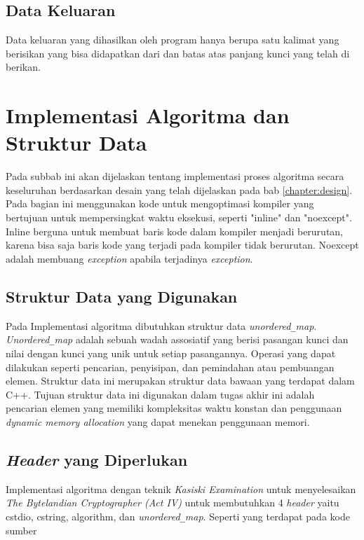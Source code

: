 \subsection{Data Keluaran}
Data keluaran yang dihasilkan oleh program hanya berupa satu kalimat yang berisikan \plaintext yang bisa didapatkan dari \ciphertext dan batas atas panjang kunci yang telah di berikan.

\section{Implementasi Algoritma dan Struktur Data}
Pada subbab ini akan dijelaskan tentang implementasi proses
algoritma secara keseluruhan berdasarkan desain yang telah
dijelaskan pada bab \ref{chapter:design}. Pada bagian ini menggunakan kode untuk mengoptimasi kompiler yang bertujuan untuk mempersingkat waktu eksekusi, seperti "inline" dan "noexcept". Inline berguna untuk membuat baris kode dalam kompiler menjadi berurutan, karena bisa saja baris kode yang terjadi pada kompiler tidak berurutan. Noexcept adalah membuang  \textit{exception} apabila terjadinya \textit{exception}.

\subsection{Struktur Data yang Digunakan}
Pada Implementasi algoritma dibutuhkan struktur data \textit{unordered}\verb|_|\textit{map}. \textit{Unordered}\verb|_|\textit{map} adalah sebuah wadah assosiatif yang berisi pasangan kunci dan nilai dengan kunci yang unik untuk setiap pasangannya. Operasi yang dapat dilakukan seperti pencarian, penyisipan, dan pemindahan atau pembuangan elemen. Struktur data ini merupakan struktur data bawaan yang terdapat dalam C++. Tujuan struktur data ini digunakan dalam tugas akhir ini adalah pencarian elemen yang memiliki kompleksitas waktu konstan dan penggunaan \textit{dynamic memory allocation} yang dapat menekan penggunaan memori. 

\subsection{\textit{Header} yang Diperlukan}
Implementasi algoritma dengan teknik \textit{Kasiski Examination} untuk menyelesaikan \textit{The Bytelandian Cryptographer (Act IV)} untuk membutuhkan 4 \textit{header} yaitu cstdio, cstring, algorithm, dan \textit{unordered}\verb|_|\textit{map}. Seperti yang terdapat pada kode sumber

